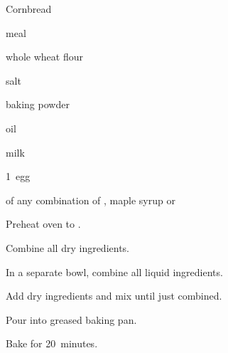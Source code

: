 \begin{recipe}{Cornbread}{}{}

\begin{ingredients}
\item {}  meal
\item {} whole wheat flour
\item \tp{\half} salt
\item {} baking powder
\item {} oil
\item {} milk
\item 1~egg
\item {} of any combination of , maple syrup or 
\end{ingredients}

\begin{directions}
\item Preheat oven to .
\item Combine all dry ingredients.
\item In a separate bowl, combine all liquid ingredients.
\item Add dry ingredients and mix until just combined.
\item Pour into  greased baking pan.
\item Bake for 20~minutes.
\end{directions}
\end{recipe}
